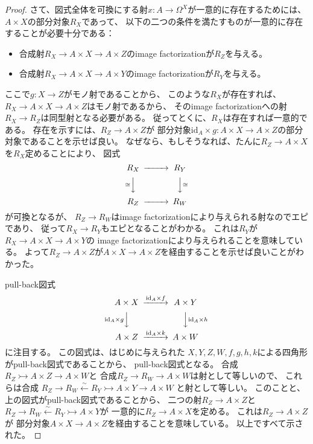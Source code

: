 \documentclass[uplatex]{jsarticle}
\theoremstyle{definition}
\def\id{\mathrm{id}}
\newcommand{\rtot}{\rightarrowtail}
\begin{document}
\begin{proof}
  さて、図式全体を可換にする射\(x:A\to \Omega^X\)が一意的に存在するためには、
  \(A\times X\)の部分対象\(R_X\)であって、
  以下の二つの条件を満たすものが一意的に存在することが必要十分である：
  \begin{itemize}
    \item
    合成射\(R_X \to A\times X \to A\times Z\)のimage factorizationが\(R_Z\)を与える。
    \item
    合成射\(R_X \to A\times X \to A\times Y\)のimage factorizationが\(R_Y\)を与える。
  \end{itemize}
  ここで\(g:X\to Z\)がモノ射であることから、
  このような\(R_X\)が存在すれば、
  \(R_X \to A\times X \to A\times Z\)はモノ射であるから、
  そのimage factorizationへの射\(R_X \to R_Z\)は同型射となる必要がある。
  従ってとくに、\(R_X\)は存在すれば一意的である。
  存在を示すには、\(R_Z\to A\times Z\)が
  部分対象\(\id_A \times g: A\times X \to A\times Z\)の部分対象であることを示せば良い。
  なぜなら、もしそうなれば、たんに\(R_Z\to A\times X\)を\(R_X\)定めることにより、
  図式
  \[
  \begin{CD}
    R_X @>>> R_Y \\
    @V\cong VV @VV \cong V \\
    R_Z @>>> R_W
  \end{CD}
  \]
  が可換となるが、
  \(R_Z\to R_W\)はimage factorizationにより与えられる射なのでエピであり、
  従って\(R_X \to R_Y\)もエピとなることがわかる。
  これは\(R_Y\)が\(R_X \to A\times X \to A\times Y\)の
  image factorizationにより与えられることを意味している。
  よって\(R_Z\to A\times Z\)が\(A\times X \to A\times Z\)を経由することを示せば良いことがわかった。

  pull-back図式
  \[
  \begin{CD}
    A\times X @> \id_A \times f >> A\times Y \\
    @V \id_A \times g VV @VV \id_A \times h V \\
    A\times Z @> \id_A \times k >> A\times W
  \end{CD}
  \]
  に注目する。
  この図式は、はじめに与えられた
  \(X,Y,Z,W,f,g,h,k\)による四角形がpull-back図式であることから、
  pull-back図式となる。
  合成\(R_Z\rtot A\times Z \to A\times W\)と
  合成\(R_Z \to R_W \to A\times W\)は射として等しいので、
  これらは合成
  \(R_Z \to R_W \xleftarrow{\sim} R_Y \rtot A\times Y \to A\times W\)
  と射として等しい。
  このことと、上の図式がpull-back図式であることから、
  二つの射\(R_Z\to A\times Z\)と
  \(R_Z \to R_W \xleftarrow{\sim} R_Y \rtot A\times Y\)が
  一意的に\(R_Z \to A\times X\)を定める。
  これは\(R_Z \to A\times Z\)が
  部分対象\(A\times X \to A\times Z\)を経由することを意味している。
  以上ですべて示された。
\end{proof}
\end{document}
